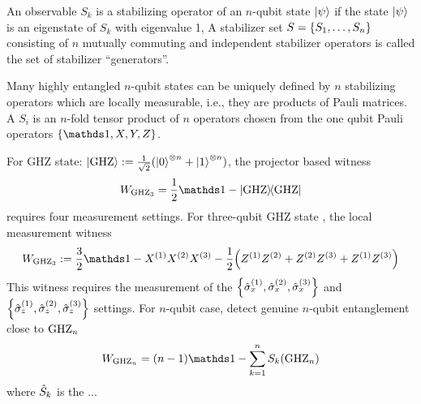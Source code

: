 \begin{definition}[stabilizer]\label{def:stabilizer}
	An observable $S_k$ is a stabilizing operator of an $n$-qubit state $\ket{\psi}$ if the state $\ket{\psi}$ is an eigenstate of $S_k$ with eigenvalue 1,
	A stabilizer set $S = \qty{ S_1, \dots , S_n}$ consisting of $n$ mutually commuting and independent stabilizer operators is called the set of stabilizer “generators”.
\end{definition}
Many highly entangled $n$-qubit states can be uniquely defined by $n$ stabilizing operators which are locally measurable, i.e., they are products of Pauli matrices.
A  $S_i$ is an $n$-fold tensor product of $n$ operators chosen from the one qubit Pauli operators $\qty{\identity,X,Y,Z}$.
\begin{example}[GHZ]\label{exm:ghz}
	For GHZ state: $\ket{\text{GHZ}}:=\frac{1}{\sqrt{2}}(\ket{0}^{\otimes n} + \ket{1}^{\otimes n} )$,
	the projector based witness 
	\begin{equation}
		\ew_{\ghz_3}= \frac{1}{2} \identity - \op{\ghz}
	\end{equation}
	requires four measurement settings.
	For three-qubit GHZ state 
	\cite{tothDetectingGenuineMultipartite2005},
	the local measurement witness
	\begin{equation}
		\ew_{\ghz_3} := \frac{3}{2} \identity - \px^{(1)}\px^{(2)}\px^{(3)}
		- \frac{1}{2} \qty(
			\pz^{(1)} \pz^{(2)} + 
			\pz^{(2)} \pz^{(3)} + 
			\pz^{(1)} \pz^{(3)} 
		)
	\end{equation}
	This witness requires the measurement of the $\qty{\hat{\sigma}_x^{(1)},\hat{\sigma}_x^{(2)},\hat{\sigma}_x^{(3)}}$ and $\qty{\hat{\sigma}_z^{(1)},\hat{\sigma}_z^{(2)},\hat{\sigma}_z^{(3)}}$ settings.
	For $n$-qubit case, detect genuine $n$-qubit entanglement close to $\text{GHZ}_n$
	\begin{equation}
		\ew_{\ghz_n} = (n-1) \identity - \sum_{k=1}^n S_k{(\ghz_n)}
	\end{equation}
	where $\hat{S}_k$ is the  ... \cite{tothEntanglementDetectionStabilizer2005}	
\end{example}

